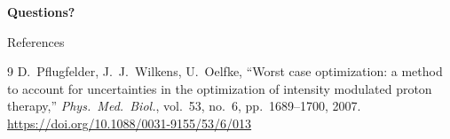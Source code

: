 \documentclass[aspectratio=169, 10pt]{beamer}
\begin{document}
\begin{frame}[plain]
  \centering
  \vfill
  {\Large\bfseries\color{tudelft} Questions?}
  \vfill
\end{frame}

\begin{frame}{References}
  \small
  \begin{thebibliography}{9}
    D.~Pflugfelder, J.~J.~Wilkens, U.~Oelfke,
    ``Worst case optimization: a method to account for uncertainties
    in the optimization of intensity modulated proton therapy,''
    \textit{Phys.~Med.~Biol.}, vol.~53, no.~6, pp.~1689--1700, 2007.\\
    \url{https://doi.org/10.1088/0031-9155/53/6/013}
  \end{thebibliography}
\end{frame}
\end{document}
